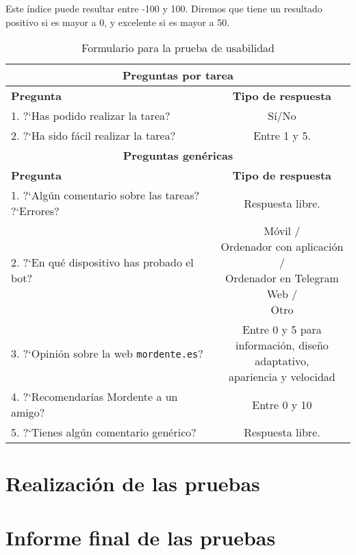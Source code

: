 Este índice puede resultar entre -100 y 100. Diremos que tiene un resultado positivo si es mayor a 0, y excelente si es mayor a 50.


\begin{table}[]
    \centering
    \begin{tabular}{|l|c|}
        \hline
        \multicolumn{2}{|c|}{\textbf{Preguntas por tarea}} \\
        \hline
        \textbf{Pregunta} & \textbf{Tipo de respuesta} \\
        \hline
        1. ?`Has podido realizar la tarea? & Sí/No \\
        \hline
        2. ?`Ha sido fácil realizar la tarea? & Entre 1 y 5. \\
        \hline
        \hline
        \multicolumn{2}{|c|}{\textbf{Preguntas genéricas}} \\
        \hline
        \textbf{Pregunta} & \textbf{Tipo de respuesta} \\
        \hline
        1. ?`Algún comentario sobre las tareas? ?`Errores? & Respuesta libre. \\
        \hline
        2. ?`En qué dispositivo has probado el bot? & \makecell{Móvil / \\Ordenador con aplicación / \\ Ordenador en Telegram Web / \\ Otro} \\
        \hline
        3. ?`Opinión sobre la web \texttt{mordente.es}? & \makecell{Entre 0 y 5 para \\ información, diseño adaptativo,\\ apariencia y velocidad} \\
        \hline
        4. ?`Recomendarías Mordente a un amigo? & Entre 0 y 10 \\
        \hline
        5. ?`Tienes algún comentario genérico? & Respuesta libre. \\
        \hline
    \end{tabular}
    \caption{Formulario para la prueba de usabilidad}
    \label{tab:preguntasPrueba}
\end{table}

\section{Realización de las pruebas}


\section{Informe final de las pruebas}

